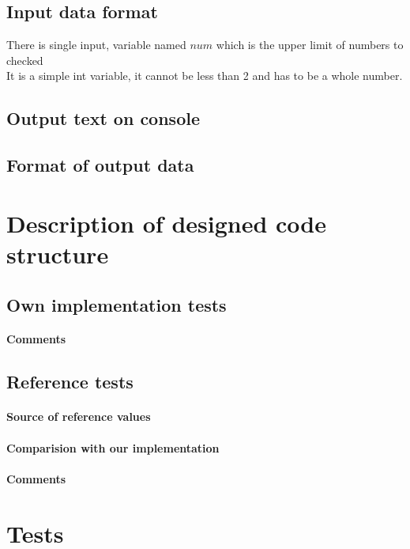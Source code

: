 \documentclass[12pt]{article}
\begin{document}
\subsection{Input data format}
There is single input, variable named $num$ which is the upper limit of numbers to checked \\ 
It is a simple int variable, it cannot be less than 2 and has to be a whole number. 
\subsection{Output text on console}
\subsection{Format of output data}
\section{Description of designed code structure}
\subsection{Own implementation tests}
\paragraph{Comments}
\subsection{Reference tests}
\paragraph{Source of reference values}
\paragraph{Comparision with our implementation}
\paragraph{Comments}
\section{Tests}
\end{document}

